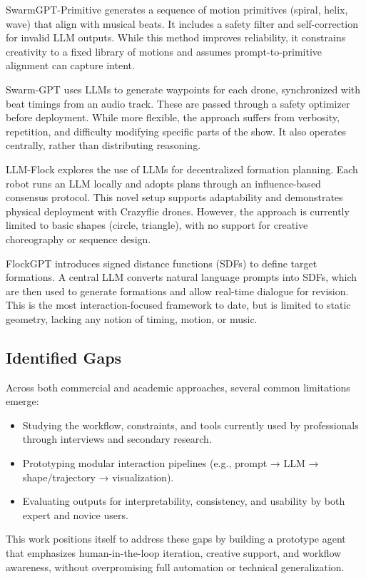 SwarmGPT-Primitive generates a sequence of motion primitives (spiral, helix, wave) that align with musical beats. It includes a safety filter and self-correction for invalid LLM outputs. While this method improves reliability, it constrains creativity to a fixed library of motions and assumes prompt-to-primitive alignment can capture intent.

Swarm-GPT uses LLMs to generate waypoints for each drone, synchronized with beat timings from an audio track. These are passed through a safety optimizer before deployment. While more flexible, the approach suffers from verbosity, repetition, and difficulty modifying specific parts of the show. It also operates centrally, rather than distributing reasoning.

LLM-Flock explores the use of LLMs for decentralized formation planning. Each robot runs an LLM locally and adopts plans through an influence-based consensus protocol. This novel setup supports adaptability and demonstrates physical deployment with Crazyflie drones. However, the approach is currently limited to basic shapes (circle, triangle), with no support for creative choreography or sequence design.

FlockGPT introduces signed distance functions (SDFs) to define target formations. A central LLM converts natural language prompts into SDFs, which are then used to generate formations and allow real-time dialogue for revision. This is the most interaction-focused framework to date, but is limited to static geometry, lacking any notion of timing, motion, or music.

\subsection{Identified Gaps}
Across both commercial and academic approaches, several common limitations emerge:
\begin{itemize}
  \item Studying the workflow, constraints, and tools currently used by professionals through interviews and secondary research.
  \item Prototyping modular interaction pipelines (e.g., prompt → LLM → shape/trajectory → visualization).
  \item Evaluating outputs for interpretability, consistency, and usability by both expert and novice users.
\end{itemize}

This work positions itself to address these gaps by building a prototype agent that emphasizes human-in-the-loop iteration, creative support, and workflow awareness, without overpromising full automation or technical generalization.

